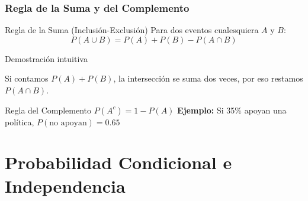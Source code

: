 \documentclass[aspectratio=169,11pt]{beamer}
\begin{document}
\begin{frame}[fragile]
\frametitle{Regla de la Suma y del Complemento}

\small

\begin{block}{Regla de la Suma (Inclusión-Exclusión)}
Para dos eventos cualesquiera $A$ y $B$:
\pause
$$P(A \cup B) = P(A) + P(B) - P(A \cap B)$$
\end{block}

\pause
\begin{exampleblock}{Demostración intuitiva}
\begin{center}

\scriptsize Si contamos $P(A)+P(B)$, la intersección se suma dos veces, por eso restamos $P(A \cap B)$.
\end{center}
\end{exampleblock}

\pause
\vspace{-0.1cm}
\begin{block}{Regla del Complemento}
$P(A^c) = 1 - P(A)$ \quad \textbf{Ejemplo:} Si 35\% apoyan una política, $P(\text{no apoyan}) = 0.65$
\end{block}
\end{frame}

\section{Probabilidad Condicional e Independencia}
\end{document}
